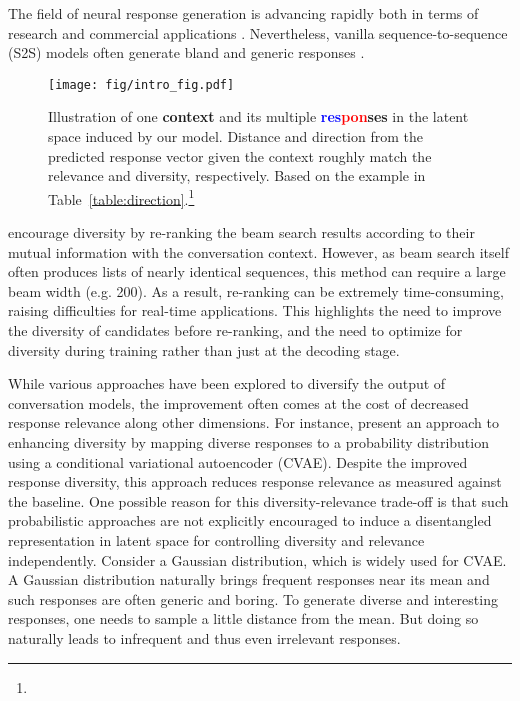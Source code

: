 \documentclass[11pt,a4paper]{article}
\begin{document}
The field of neural response generation is advancing rapidly both in terms of research and commercial applications \cite{gao2019neural, xiaoice, dstc7all, yizhe2019consistent}.  Nevertheless, vanilla sequence-to-sequence (S2S) models often generate  bland  and  generic responses \cite{li2016mmi}.
\begin{figure}[t]
    \centering
    \texttt{[image: fig/intro\_fig.pdf]}
    \caption{Illustration of one \textbf{context} and its multiple \textbf{ \textcolor{blue}{res}\textcolor{red}{pon}\textcolor{mygreen}{ses}} in the latent space induced by our model. Distance and direction from the predicted response vector given the context roughly match the relevance and diversity, respectively. Based on the example in Table~\ref{table:direction}.\footnote{}}
    \label{fig:intro}
\end{figure}
\citet{li2016mmi} encourage diversity by re-ranking the beam search results according to their mutual information with the conversation context. However, as beam search itself often produces lists of nearly identical sequences, this method can require a large beam width (e.g. 200). As a result, re-ranking can be extremely time-consuming, raising difficulties for real-time applications. This highlights the need to improve the diversity 
of candidates before re-ranking, and the need to optimize for diversity during training rather than just at the decoding stage. 

While various approaches have been explored to diversify the output of  conversation models, the improvement often comes at the cost of decreased response relevance along other dimensions.
For instance, \citet{zhao2017cvae} present an approach to enhancing diversity by mapping diverse responses to a probability distribution
using a conditional variational autoencoder (CVAE). Despite the improved response diversity, this approach reduces response relevance as measured against the baseline.
One possible reason for this diversity-relevance trade-off is that such probabilistic approaches are not explicitly encouraged to induce a 
disentangled representation in latent space for controlling diversity and relevance independently. 
Consider a Gaussian distribution, which is widely used for CVAE. A Gaussian distribution naturally brings frequent responses near its mean and such responses are often generic and boring. 
To generate diverse and interesting responses, one needs to sample a little distance from the mean. But doing so naturally leads to infrequent and thus even irrelevant responses.
\end{document}
